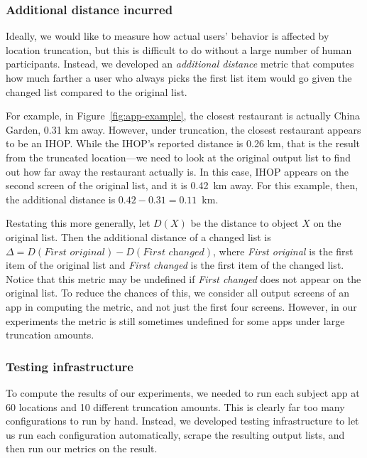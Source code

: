 \subsubsection{Additional distance incurred}

Ideally, we would like to measure how actual users' behavior is
affected by location truncation, but this is difficult to do without a large
number of human participants. Instead, we developed an \emph{additional
  distance} metric that computes how much farther a user who always
picks the first list item would go given the changed list compared to
the original list.

For example, in Figure~\ref{fig:app-example}, the closest restaurant
is actually China Garden, 0.31 km away. However, under truncation, the
closest restaurant appears to be an IHOP. While the IHOP's reported
distance is 0.26 km, that is the result from the truncated
location---we need to look at the original output list to find out how
far away the restaurant actually is. In this case, IHOP appears on the
second screen of the original list, and it is 0.42~km
away. For this example, then, the additional distance is $0.42 - 0.31
= 0.11$~km.

Restating this more generally, let $D(X)$ be the distance to object
$X$ on the original list. Then the additional distance of a changed
list is $\Delta = D(\textit{First original}) - D(\textit{First changed})$, where
\textit{First original} is the first item of the original list and
\textit{First changed} is the first item of the changed list. Notice
that this metric may be undefined if \emph{First changed} does not
appear on the original list. To reduce the chances of this, we
consider all output screens of an app in computing the metric, and not
just the first four screens. However, in our experiments the metric is
still sometimes undefined for some apps under large truncation amounts.

\subsubsection{Testing infrastructure}

To compute the results of our experiments, we needed to run each
subject app at 60 locations and 10 different truncation
amounts. This is clearly far too many configurations to run by
hand. Instead, we developed testing infrastructure to let us run each
configuration automatically, scrape the resulting output lists, and
then run our metrics on the result.


